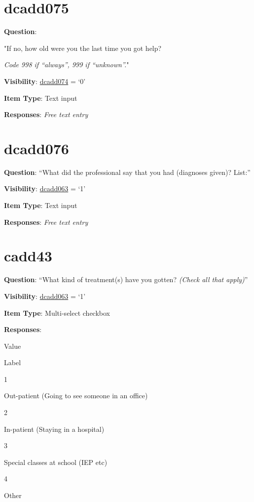 \documentclass[]{book}
\begin{document}
\hypertarget{dcadd075}{%
\section{dcadd075}\label{dcadd075}}

\textbf{Question}:

"If no, how old were you the last time you got help?

\emph{Code 998 if ``always'', 999 if ``unknown''.}"

\textbf{Visibility}: \protect\hyperlink{dcadd074}{dcadd074} = `0'

\textbf{Item Type}: Text input

\textbf{Responses}: \emph{Free text entry}

\hypertarget{dcadd076}{%
\section{dcadd076}\label{dcadd076}}

\textbf{Question}: ``What did the professional say that you had (diagnoses given)? List:''

\textbf{Visibility}: \protect\hyperlink{dcadd063}{dcadd063} = `1'

\textbf{Item Type}: Text input

\textbf{Responses}: \emph{Free text entry}

\hypertarget{cadd43}{%
\section{cadd43}\label{cadd43}}

\textbf{Question}: ``What kind of treatment(s) have you gotten? \emph{(Check all that apply)}''

\textbf{Visibility}: \protect\hyperlink{dcadd063}{dcadd063} = `1'

\textbf{Item Type}: Multi-select checkbox

\textbf{Responses}:

Value

Label

1

Out-patient (Going to see someone in an office)

2

In-patient (Staying in a hospital)

3

Special classes at school (IEP etc)

4

Other
\end{document}
